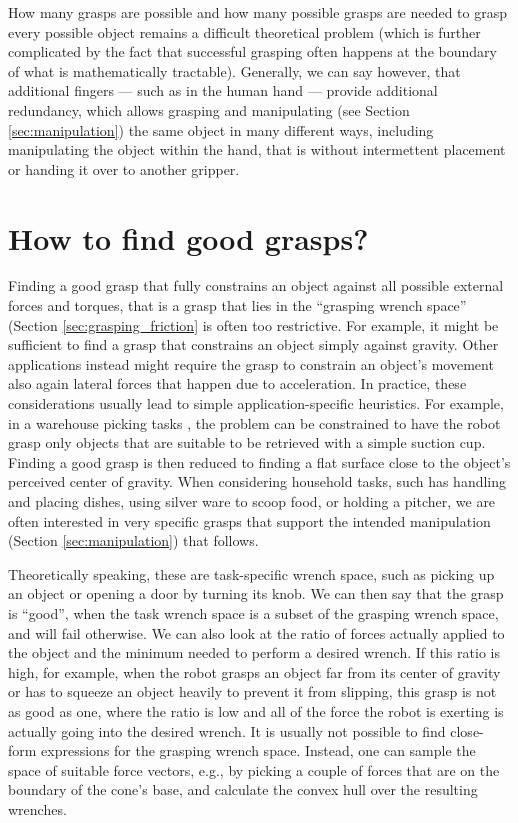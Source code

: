 How many grasps are possible and how many possible grasps are needed to grasp every possible object remains a difficult theoretical problem (which is further complicated by the fact that successful grasping often happens at the boundary of what is mathematically tractable). Generally, we can say however, that additional fingers --- such as in the human hand --- provide additional redundancy, which allows grasping and manipulating (see Section \ref{sec:manipulation}) the same object in many different ways, including manipulating the object within the hand, that is without intermettent placement or handing it over to another gripper. 




\section{How to find good grasps?}

Finding a good grasp that fully constrains an object against all possible external forces and torques, that is a grasp that lies in the ``grasping wrench space'' (Section \ref{sec:grasping_friction} is often too restrictive. For example, it might be sufficient to find a grasp that constrains an object simply against gravity. Other applications instead might require the grasp to constrain an object's movement also again lateral forces that happen due to acceleration. In practice, these considerations usually lead to simple application-specific heuristics. For example, in a warehouse picking tasks \cite{correll2016analysis}, the problem can be constrained to have the robot grasp only objects that are suitable to be retrieved with a simple suction cup. Finding a good grasp is then reduced to finding a flat surface close to the object's perceived center of gravity. When considering household tasks, such has handling and placing dishes, using silver ware to scoop food, or holding a pitcher, we are often interested in very specific grasps that support the intended manipulation (Section \ref{sec:manipulation}) that follows. 


Theoretically speaking, these are task-specific wrench space, such as picking up an object or opening a door by turning its knob. We can then say that the grasp is ``good'', when the task wrench space is a subset of the grasping wrench space, and will fail otherwise. We can also look at the ratio of forces actually applied to the object and the minimum needed to perform a desired wrench. If this ratio is high, for example, when the robot grasps an object far from its center of gravity or has to squeeze an object heavily to prevent it from slipping, this grasp is not as good as one, where the ratio is low and all of the force the robot is exerting is actually going into the desired wrench. It is usually not possible to find close-form expressions for the grasping wrench space. Instead, one can sample the space of suitable force vectors, e.g., by picking a couple of forces that are on the boundary of the cone's base, and calculate the convex hull over the resulting wrenches.

